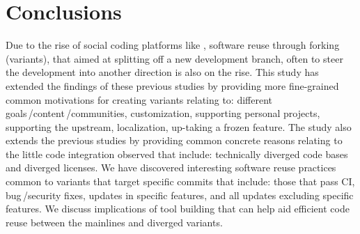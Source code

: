 \section{Conclusions}
Due to the rise of social coding platforms like \gh, software reuse through forking (variants), that aimed at splitting off a new development branch, often to steer the development into another direction is also on the rise. 
This study has extended the findings of these previous studies by providing more fine-grained common motivations for creating variants relating to: different goals\,/content\,/communities, customization, supporting personal projects, supporting the upstream, localization, up-taking a frozen feature.
The study also extends the previous studies by providing common concrete reasons relating to the little code integration observed that include: technically diverged code bases and diverged licenses.
We have discovered interesting software reuse practices common to variants that target specific commits that include: those that pass CI, bug\,/security fixes, updates in specific features, and all updates excluding specific features. We
discuss implications of tool building that can help aid efficient code reuse between the mainlines and diverged variants.